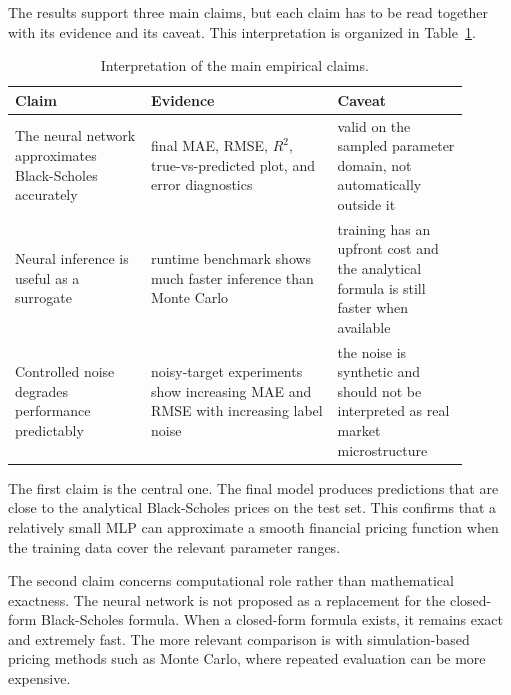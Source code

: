 The results support three main claims, but each claim has to be read together with its evidence and its caveat.
This interpretation is organized in Table~\ref{tab:discussion-claims}.

\begin{table}[H]
    \centering
    \begin{tabular}{
        >{\raggedright\arraybackslash}p{0.27\linewidth}
        >{\raggedright\arraybackslash}p{0.37\linewidth}
        >{\raggedright\arraybackslash}p{0.26\linewidth}
        }
        \toprule
        Claim & Evidence                                                                               & Caveat \\
        \midrule
        The neural network approximates Black-Scholes accurately
              & final MAE, RMSE, $R^2$, true-vs-predicted plot, and error diagnostics
              & valid on the sampled parameter domain, not automatically outside it                             \\
        \projecttablerowsep
        Neural inference is useful as a surrogate
              & runtime benchmark shows much faster inference than Monte Carlo
              & training has an upfront cost and the analytical formula is still faster when available          \\
        \projecttablerowsep
        Controlled noise degrades performance predictably
              & noisy-target experiments show increasing MAE and RMSE with increasing label noise
              & the noise is synthetic and should not be interpreted as real market microstructure              \\
        \bottomrule
    \end{tabular}
    \caption{Interpretation of the main empirical claims.}
    \label{tab:discussion-claims}
\end{table}

The first claim is the central one.
The final model produces predictions that are close to the analytical Black-Scholes prices on the test set.
This confirms that a relatively small MLP can approximate a smooth financial pricing function when the training data cover the relevant parameter ranges.

The second claim concerns computational role rather than mathematical exactness.
The neural network is not proposed as a replacement for the closed-form Black-Scholes formula.
When a closed-form formula exists, it remains exact and extremely fast.
The more relevant comparison is with simulation-based pricing methods such as Monte Carlo, where repeated evaluation can be more expensive.

